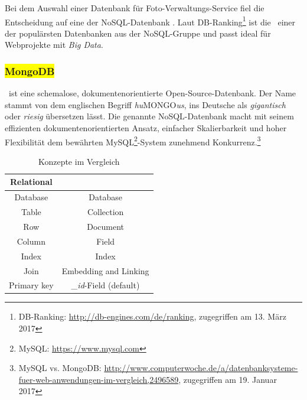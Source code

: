 Bei dem Auswahl einer Datenbank für Foto-Verwaltungs-Service fiel die Entscheidung auf eine der NoSQL-Datenbank \mongo. Laut DB-Ranking\footnote{DB-Ranking: \url{http://db-engines.com/de/ranking}, zugegriffen am 13. März 2017} ist die \mongo\ einer der populärsten Datenbanken aus der NoSQL-Gruppe und passt ideal für Webprojekte mit \textit{Big Data}.




\subsubsection{\colorbox{yellow}{MongoDB}}\label{mongo}

\mongo\ ist eine  schemalose, dokumentenorientierte Open-Source-Datenbank. Der Name stammt von dem englischen Begriff \textit{hu}MONGO\textit{us}, ins Deutsche als \textit{gigantisch} oder \textit{riesig} übersetzen lässt. Die genannte NoSQL-Datenbank macht mit seinem effizienten dokumentenorientierten Ansatz, einfacher Skalierbarkeit und hoher Flexibilität dem bewährten MySQL\footnote{MySQL: \url{https://www.mysql.com}}-System zunehmend Konkurrenz.\footnote{MySQL vs. MongoDB: \url{http://www.computerwoche.de/a/datenbanksysteme-fuer-web-anwendungen-im-vergleich,2496589}, zugegriffen am 19. Januar 2017} 


\newcommand*{\head}[1]{\textbf{#1}}%

\begin{table}[h]
\centering
\begin{tabular}{cc}
\toprule 
    \rowcolor{gray!50}
	Relational & \mongo\ \\
	\midrule
	Database &  Database\\
	Table & Collection\\
	Row &  Document\\
	Column &  Field\\
	Index & Index\\
	Join &  Embedding and Linking\\
	Primary key & \textit{\_id}-Field (default)\\
	\bottomrule
\end{tabular}
\caption[Konzepte im Vergleich]{Konzepte im Vergleich}
\label{table:concepts}
\end{table}


